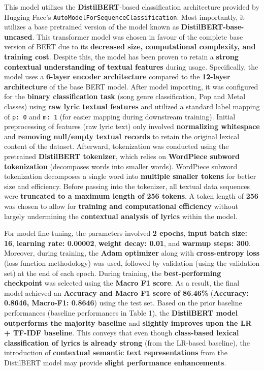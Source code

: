 This model utilizes the \textbf{DistilBERT}-based classification architecture provided by Hugging Face's \texttt{AutoModelForSequenceClassification}. Most importantly, it utilizes a base pretrained version of the model known as \textbf{DistilBERT-base-uncased}. This transformer model was chosen in favour of the complete base version of BERT due to its \textbf{decreased size, computational complexity, and training cost}. Despite this, the model has been proven to retain a \textbf{strong contextual understanding of textual features} during usage. Specifically, the model uses a \textbf{6-layer encoder architecture} compared to the \textbf{12-layer architecture} of the base BERT model. After model importing, it was configured for the \textbf{binary classification task} (song genre classification, Pop and Metal classes) using \textbf{raw lyric textual features} and utilized a standard label mapping of \texttt{p: 0} and \texttt{m: 1} (for easier mapping during downstream training). Initial preprocessing of features (raw lyric text) only involved \textbf{normalizing whitespace} and \textbf{removing null/empty textual records} to retain the original lexical content of the dataset. Afterward, tokenization was conducted using the pretrained \textbf{DistilBERT tokenizer}, which relies on \textbf{WordPiece subword tokenization} (decomposes words into smaller words). WordPiece subword tokenization decomposes a single word into \textbf{multiple smaller tokens} for better size and efficiency. Before passing into the tokenizer, all textual data sequences were \textbf{truncated to a maximum length of 256 tokens}. A token length of \textbf{256} was chosen to allow for \textbf{training and computational efficiency} without largely undermining the \textbf{contextual analysis of lyrics} within the model.

For model fine-tuning, the parameters involved \textbf{2 epochs}, \textbf{input batch size: 16}, \textbf{learning rate: 0.00002}, \textbf{weight decay: 0.01}, and \textbf{warmup steps: 300}. Moreover, during training, the \textbf{Adam optimizer} along with \textbf{cross-entropy loss} (loss function methodology) was used, followed by validation (using the validation set) at the end of each epoch. During training, the \textbf{best-performing checkpoint} was selected using the \textbf{Macro F1 score}. As a result, the final model achieved an \textbf{Accuracy and Macro F1 score of 86.46\%} (\textbf{Accuracy: 0.8646, Macro-F1: 0.8646}) using the test set. Based on the prior baseline performances (baseline performances in Table 1), the \textbf{DistilBERT model outperforms the majority baseline} and \textbf{slightly improves upon the LR + TF-IDF baseline}. This conveys that even though \textbf{class-based lexical classification of lyrics is already strong} (from the LR-based baseline), the introduction of \textbf{contextual semantic text representations} from the DistilBERT model may provide \textbf{slight performance enhancements}.